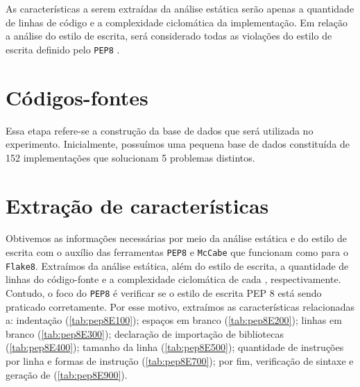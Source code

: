 		As características a serem extraídas da análise estática serão apenas a quantidade
		de linhas de código e a complexidade ciclomática da implementação. Em relação
		a análise do estilo de escrita, será considerado todas as violações do estilo de
		escrita definido pelo \texttt{PEP8} \cite{van2001pep}. 

	\section{Códigos-fontes}	
		Essa etapa refere-se a construção da base de dados que será utilizada no experimento.
		Inicialmente, possuímos uma pequena base de dados constituída de 152 implementações
		que solucionam 5 problemas distintos.
		
	\section{Extração de características}
		Obtivemos as informações necessárias por meio da análise estática e do estilo de   %
		escrita com o auxílio das ferramentas \texttt{PEP8} \cite{pep8} e \texttt{McCabe}
		\cite{mccabe} que funcionam como  para o \texttt{Flake8}.
		Extraímos da análise estática, além do estilo de escrita, a quantidade de linhas do código-fonte e a %
		complexidade ciclomática de cada , respectivamente. Contudo, o
		foco do \texttt{PEP8} é verificar se o estilo de escrita PEP 8 \cite{van2001pep}
		está sendo praticado corretamente. Por esse motivo, extraímos as características
		relacionadas a: indentação (\cref{tab:pep8E100}); espaços em branco
		(\cref{tab:pep8E200}); linhas em branco (\cref{tab:pep8E300}); declaração de
		importação de bibliotecas (\cref{tab:pep8E400}); tamanho da linha (\cref{tab:pep8E500});
		quantidade de instruções por linha e formas de instrução (\cref{tab:pep8E700}); por fim,
		verificação de sintaxe e geração de  (\cref{tab:pep8E900}).
	
